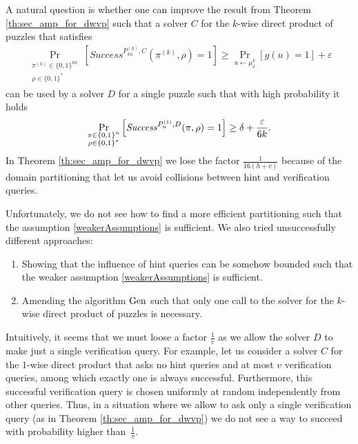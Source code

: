 A natural question is whether one can improve the result from Theorem \ref{th:sec_amp_for_dwvp}
such that a solver $C$ for the $k$-wise direct product of puzzles that satisfies
\begin{align}
    \label{weakerAssumptions}
    \underset{\substack{\pi^{(k)} \in \{0,1\}^{kn} \\ \rho \in \{0,1\}^{*}}}{\Pr}\left[\mathit{Success}^{P_{kn}^{(g)}, C}(\pi^{(k)}, \rho) = 1\right]
    \geq \underset{u \leftarrow \mu_\delta^k}{\Pr}[g(u) = 1] + \varepsilon
\end{align}
can be used by a solver $D$ for a single puzzle such that with high probability it holds
  \begin{align}
    \underset{\substack{\pi \in \{0,1\}^{n} \\ \rho \in \{0,1\}^{*}}}
    {\Pr}\left[\operatorname{\mathit{Success}}^{P_{n}^{(1)},D}(\pi, \rho) = 1\right] \geq \delta + \frac{\varepsilon}{6k}.
  \end{align}
In Theorem \ref{th:sec_amp_for_dwvp} we lose the factor $\frac{1}{16(h+v)}$ because of the domain partitioning that let us avoid collisions between hint and verification queries.

Unfortunately, we do not see how to find a more efficient partitioning such that the assumption \eqref{weakerAssumptions} is sufficient.
We also tried unsuccessfully different approaches:
\begin{enumerate}[-]
  \item Showing that the influence of hint queries can be somehow bounded such that the weaker assumption \eqref{weakerAssumptions} is sufficient.
  \item Amending the algorithm $\operatorname{\text{Gen}}$ such that only one call to the solver for the $k$-wise direct product of puzzles is necessary.
\end{enumerate}

Intuitively, it seems that we must loose a factor $\frac{1}{v}$ as we allow the solver $D$ to make just a single verification query.
For example, let us consider a solver $C$ for the $1$-wise direct product that asks no hint queries and at most $v$ verification queries,
among which exactly one is always successful.
Furthermore, this successful verification query is chosen uniformly at random independently from other queries.
Thus, in a situation where we allow to ask only a single verification query (as in Theorem \ref{th:sec_amp_for_dwvp})
we do not see a way to succeed with probability higher than~$\frac{1}{v}$.

